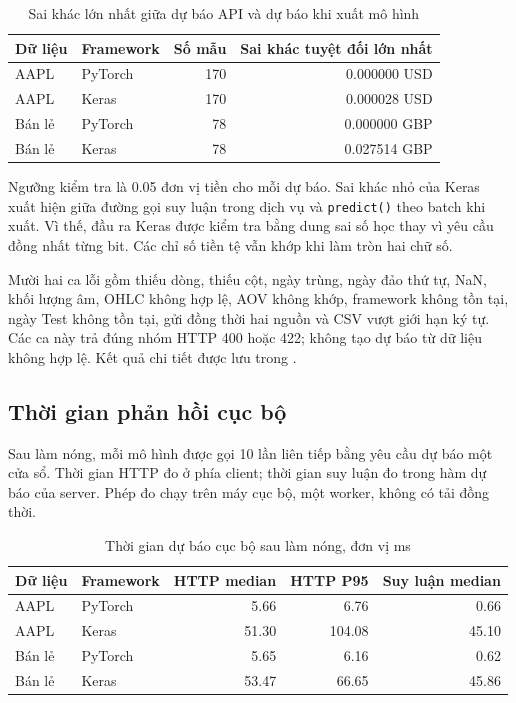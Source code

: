 \documentclass[12pt,a4paper]{report}
\begin{document}
\begin{table}[H]\centering\small
\caption{Sai khác lớn nhất giữa dự báo API và dự báo khi xuất mô hình}\label{tab:api-parity}
\begin{tabular}{@{}llrr@{}}\toprule
Dữ liệu & Framework & Số mẫu & Sai khác tuyệt đối lớn nhất \\\midrule
AAPL & PyTorch & 170 & 0.000000 USD \\
AAPL & Keras & 170 & 0.000028 USD \\
Bán lẻ & PyTorch & 78 & 0.000000 GBP \\
Bán lẻ & Keras & 78 & 0.027514 GBP \\\bottomrule
\end{tabular}
\end{table}

Ngưỡng kiểm tra là 0.05 đơn vị tiền cho mỗi dự báo. Sai khác nhỏ của Keras xuất hiện giữa đường gọi suy luận trong dịch vụ và \texttt{predict()} theo batch khi xuất. Vì thế, đầu ra Keras được kiểm tra bằng dung sai số học thay vì yêu cầu đồng nhất từng bit. Các chỉ số tiền tệ vẫn khớp khi làm tròn hai chữ số.

Mười hai ca lỗi gồm thiếu dòng, thiếu cột, ngày trùng, ngày đảo thứ tự, NaN, khối lượng âm, OHLC không hợp lệ, AOV không khớp, framework không tồn tại, ngày Test không tồn tại, gửi đồng thời hai nguồn và CSV vượt giới hạn ký tự. Các ca này trả đúng nhóm HTTP 400 hoặc 422; không tạo dự báo từ dữ liệu không hợp lệ. Kết quả chi tiết được lưu trong .

\subsection{Thời gian phản hồi cục bộ}
Sau làm nóng, mỗi mô hình được gọi 10 lần liên tiếp bằng yêu cầu dự báo một cửa sổ. Thời gian HTTP đo ở phía client; thời gian suy luận đo trong hàm dự báo của server. Phép đo chạy trên máy cục bộ, một worker, không có tải đồng thời.

\begin{table}[H]\centering\small
\caption{Thời gian dự báo cục bộ sau làm nóng, đơn vị ms}\label{tab:api-latency}
\begin{tabular}{@{}llrrr@{}}\toprule
Dữ liệu & Framework & HTTP median & HTTP P95 & Suy luận median \\\midrule
AAPL & PyTorch & 5.66 & 6.76 & 0.66 \\
AAPL & Keras & 51.30 & 104.08 & 45.10 \\
Bán lẻ & PyTorch & 5.65 & 6.16 & 0.62 \\
Bán lẻ & Keras & 53.47 & 66.65 & 45.86 \\\bottomrule
\end{tabular}
\end{table}
\end{document}
